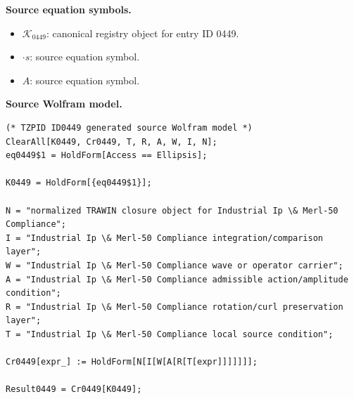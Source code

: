 \begin{minipage}[t]{0.49\linewidth}
\begingroup
\small
\raggedright
\textbf{Source equation symbols.}\par
\begin{itemize}[leftmargin=1.35em,itemsep=1pt,topsep=1pt,parsep=0pt]
    \item $\mathcal{K}_{0449}$: canonical registry object for entry ID 0449.
    \item $\cdot s$: source equation symbol.
    \item $A$: source equation symbol.
\end{itemize}
\endgroup
\end{minipage}\hfill
\begin{minipage}[t]{0.47\linewidth}
\begingroup
\scriptsize
\raggedright
\textbf{Source Wolfram model.}\par
\begin{Verbatim}[fontsize=\tiny,breaklines=true,breakanywhere=true]
(* TZPID ID0449 generated source Wolfram model *)
ClearAll[K0449, Cr0449, T, R, A, W, I, N];
eq0449$1 = HoldForm[Access == Ellipsis];

K0449 = HoldForm[{eq0449$1}];

N = "normalized TRAWIN closure object for Industrial Ip \& Merl-50 Compliance";
I = "Industrial Ip \& Merl-50 Compliance integration/comparison layer";
W = "Industrial Ip \& Merl-50 Compliance wave or operator carrier";
A = "Industrial Ip \& Merl-50 Compliance admissible action/amplitude condition";
R = "Industrial Ip \& Merl-50 Compliance rotation/curl preservation layer";
T = "Industrial Ip \& Merl-50 Compliance local source condition";

Cr0449[expr_] := HoldForm[N[I[W[A[R[T[expr]]]]]]];

Result0449 = Cr0449[K0449];
\end{Verbatim}
\endgroup
\end{minipage}

